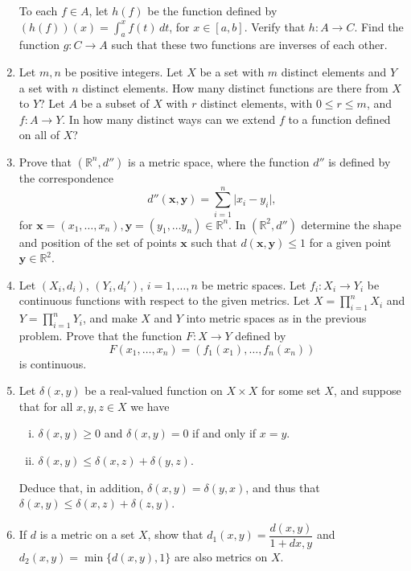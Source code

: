\documentclass[letterpaper,12pt]{article}
\newcommand{\abs}[1]{\lvert #1\rvert}
\newcommand{\R}{\mathbb{R}}
\newcommand{\x}{\mathbf{x}}
\newcommand{\y}{\mathbf{y}}
\begin{document}
\begin{enumerate}
To each $f\in A$, let $h(f)$ be the function defined by $(h(f))(x) = \int_a^x f(t)\,dt$, for $x\in [a,b]$. Verify that $h:A\to C$. Find the function $g:C\to A$ such that these two functions are inverses of each other.
 \item Let $m,n$ be positive integers. Let $X$ be a set with $m$ distinct elements and $Y$ a set with $n$ distinct elements. How many distinct functions are there from $X$ to $Y$? Let $A$ be a subset of $X$ with $r$ distinct elements, with $0\leq r\leq m$, and $f:A\to Y$. In how many distinct ways can we extend $f$ to a function defined on all of $X$?
 \item Prove that $(\R^n,d'')$ is a metric space, where the function $d''$ is defined by the correspondence
\[
d''(\x,\y) = \sum_{i=1}^n\abs{x_i-y_i},
\]
for $\x=(x_1,\ldots, x_n),\y=(y_1,\ldots y_n)\in\R^n$. In $(\R^2,d'')$ determine the shape and position of the set of points $\x$ such that $d(\x,\y)\leq 1$ for a given point $\y\in\R^2$.
 \item Let $(X_i,d_i)$, $(Y_i,d_i')$, $i=1,\ldots, n$ be metric spaces. Let $f_i:X_i\to Y_i$ be continuous functions with respect to the given metrics. Let $X=\prod_{i=1}^nX_i$ and $Y=\prod_{i=1}^nY_i$, and make $X$ and $Y$ into metric spaces as in the previous problem. Prove that the function $F:X\to Y$ defined by
\[
 F(x_1,\ldots, x_n) = (f_1(x_1),\ldots, f_n(x_n))
\]
is continuous.
 \item Let $\delta(x,y)$ be a real-valued function on $X\times X$ for some set $X$, and suppose that for all $x,y,z\in X$ we have
\begin{enumerate}[(i)]
 \item $\delta(x,y)\geq 0$ and $\delta(x,y)=0$ if and only if $x=y$.
 \item $\delta(x,y)\leq \delta(x,z)+\delta(y,z)$.
\end{enumerate}
Deduce that, in addition, $\delta(x,y)=\delta(y,x)$, and thus that $\delta(x,y)\leq \delta(x,z)+\delta(z,y)$.
 \item If $d$ is a metric on a set $X$, show that $d_1(x,y) = \dfrac{d(x,y)}{1+d{x,y}}$ and $d_2(x,y)=\min\{d(x,y),1\}$ are also metrics on $X$.
\end{enumerate}
\end{document}
